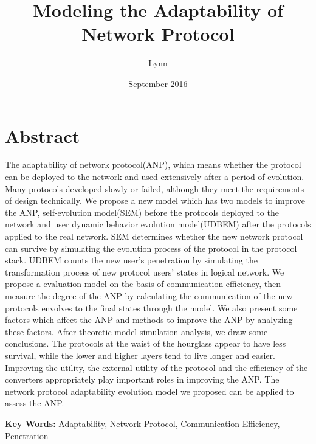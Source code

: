 \documentclass{article}
\title{Modeling the Adaptability of Network Protocol}
\author{Lynn }
\date{September 2016}
\begin{document}
\maketitle

\section*{Abstract}
The adaptability of network protocol(ANP), which means whether the protocol can be deployed to the network 
and used extensively after a period of evolution. Many protocols developed slowly or failed, although they 
meet the requirements of design technically. We propose a new model which has two models to improve the ANP, 
self-evolution model(SEM) before the protocols deployed to the network and user dynamic behavior evolution 
model(UDBEM) after the protocols applied to the real network. SEM determines whether the new network protocol 
can survive by simulating the evolution process of the protocol in the protocol stack. UDBEM counts the new 
user's penetration by simulating the transformation process of new protocol users' states in logical network. 
We propose a evaluation model on the basis of communication efficiency, then measure the degree of the ANP by 
calculating the communication of the new protocols envolves to the final states through the model. We also 
present some factors which affect the ANP and methods to improve the ANP by analyzing these factors.  After 
theoretic model simulation analysis, we draw some conclusions. The protocols at the waist of the hourglass 
appear to have less survival, while the lower and higher layers tend to live longer and easier. Improving the 
utility, the external utility of the protocol and the efficiency of the converters appropriately play important 
roles in improving the ANP. The network protocol adaptability evolution model we proposed can be applied to 
assess the ANP.

\setlength{\parskip}{0.5\baselineskip}
\par\noindent \textbf {Key Words:}
Adaptability, Network Protocol, Communication Efficiency, Penetration
\end{document}
